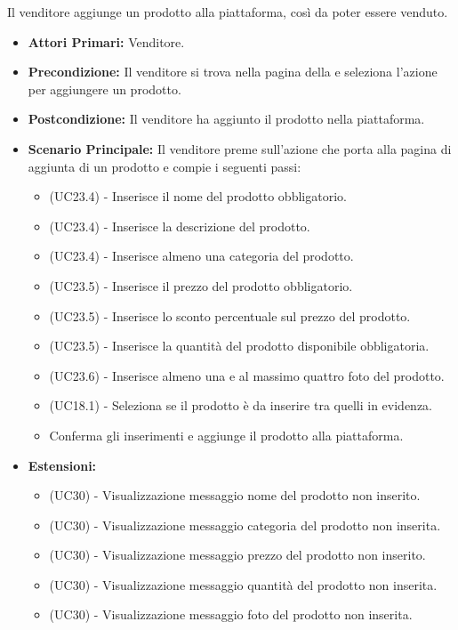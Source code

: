 Il venditore aggiunge un prodotto alla piattaforma, così da poter essere venduto.
\begin{itemize}
    \item \textbf{Attori Primari:} Venditore.
    \item \textbf{Precondizione:} Il venditore si trova nella pagina della  e seleziona l'azione per aggiungere un prodotto.
    \item \textbf{Postcondizione:} Il venditore ha aggiunto il prodotto nella piattaforma.
    \item \textbf{Scenario Principale:} Il venditore preme sull'azione che porta alla pagina di aggiunta di un prodotto e compie i seguenti passi:
    \begin{itemize}
        \item (UC23.4) - Inserisce il nome del prodotto obbligatorio.
        \item (UC23.4) - Inserisce la descrizione del prodotto.
        \item (UC23.4) - Inserisce almeno una categoria del prodotto.
        \item (UC23.5) - Inserisce il prezzo del prodotto obbligatorio.
        \item (UC23.5) - Inserisce lo sconto percentuale sul prezzo del prodotto.
        \item (UC23.5) - Inserisce la quantità del prodotto disponibile obbligatoria.
        \item (UC23.6) - Inserisce almeno una e al massimo quattro foto del prodotto.
        \item (UC18.1) - Seleziona se il prodotto è da inserire tra quelli in evidenza.
        \item Conferma gli inserimenti e aggiunge il prodotto alla piattaforma.
    \end{itemize}
    \item \textbf{Estensioni:}
    \begin{itemize}
        \item (UC30) - Visualizzazione messaggio nome del prodotto non inserito.
        \item (UC30) - Visualizzazione messaggio categoria del prodotto non inserita.
        \item (UC30) - Visualizzazione messaggio prezzo del prodotto non inserito.
        \item (UC30) - Visualizzazione messaggio quantità del prodotto non inserita.
        \item (UC30) - Visualizzazione messaggio foto del prodotto non inserita.
    \end{itemize}
\end{itemize}

